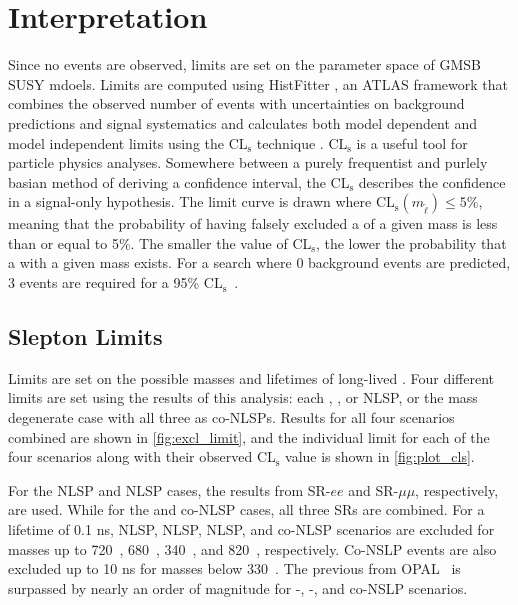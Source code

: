 \chapter{Interpretation}

Since no events are observed, limits are set on the parameter space of \ac{GMSB} \ac{SUSY} mdoels. Limits are computed using HistFitter \cite{histfitter}, an \ac{ATLAS} framework that combines the observed number of events with uncertainties on background predictions and signal systematics and calculates both model dependent and model independent limits using the CL$_{\text{s}}$ technique \cite{CLs-1}. CL$_{\text{s}}$ is a useful tool for particle physics analyses. Somewhere between a purely frequentist and purlely basian method of deriving a confidence interval, the CL$_{\text{s}}$ describes the confidence in a signal-only hypothesis. The limit curve is drawn where CL$_{\text{s}}(m_{\tilde{\ell}}) \leq 5\%$, meaning that the probability of having falsely excluded a \slep of a given mass is less than or equal to 5\%. The smaller the value of CL$_{\text{s}}$, the lower the probability that a \slep with a given mass exists. For a search where 0 background events are predicted, 3 events are required for a 95\% CL$_{\text{s}}$~\cite{better-than-zero}.

\section{Slepton Limits}
Limits are set on the possible masses and lifetimes of long-lived \slep. Four different limits are set using the results of this analysis: each \selec, \smu, or \stau \ac{NLSP}, or the mass degenerate case with all three as co-\ac{NLSP}s. Results for all four scenarios combined are shown in \autoref{fig:excl_limit}, and the individual limit for each of the four scenarios along with their observed CL$_{\text{s}}$ value is shown in \autoref{fig:plot_cls}.

For the \selec \ac{NLSP} and \smu \ac{NLSP} cases, the results from SR-$ee$ and SR-$\mu\mu$, respectively, are used. While for the \stau and co-\ac{NLSP} cases, all three SRs are combined. For a lifetime of 0.1 ns, \selec NLSP, \smu \ac{NLSP}, \stau \ac{NLSP}, and co-NLSP scenarios are excluded for \slep masses up to 720~\GeV, 680~\GeV, 340~\GeV, and 820~\GeV, respectively. Co-NSLP events are also excluded up to 10 ns for masses below 330~\GeV. The previous from OPAL~\cite{opal} is surpassed by nearly an order of magnitude for \selec-, \smu-, and co-NSLP scenarios.


